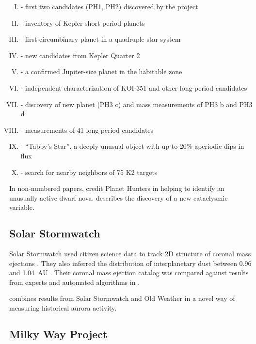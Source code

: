 \documentclass[twocolumn]{aastex6}
\begin{document}
\begin{enumerate}[(I)]

\item \citet{fis12} - first two candidates (PH1, PH2) discovered by the project
\item \citet{sch12} - inventory of Kepler short-period planets
\item \citet{sch13} - first circumbinary planet in a quadruple star system
\item \citet{lin13} - new candidates from Kepler Quarter 2
\item \citet{wan13} - a confirmed Jupiter-size planet in the habitable zone
\item \citet{sch14c} - independent characterization of KOI-351 and other long-period candidates
\item \citet{sch14b} - discovery of new planet (PH3 c) and mass measurements of PH3 b and PH3 d
\item \citet{wan15} - measurements of 41 long-period candidates
\item \citet{boy16} - ``Tabby's Star'', a deeply unusual object with up to 20\% aperiodic dips in flux
\item \citet{sch16} - search for nearby neighbors of 75 K2 targets

\end{enumerate}

\noindent In non-numbered papers, \citet{kat14} credit Planet Hunters in helping to identify an unusually active dwarf nova. \citet{gie13} describes the discovery of a new cataclysmic variable.

\subsection{Solar Stormwatch}

Solar Stormwatch used citizen science data to track 2D structure of coronal mass ejections \citep{sav12}. They also inferred the distribution of interplanetary dust between 0.96 and 1.04~AU \citep{dav12}. Their coronal mass ejection catalog \citep{bar14} was compared against results from experts and automated algorithms in \citet{tuc14,bar15}.

\citet{wil16} combines results from Solar Stormwatch and Old Weather in a novel way of measuring historical aurora activity.

\subsection{Milky Way Project}
\end{document}
